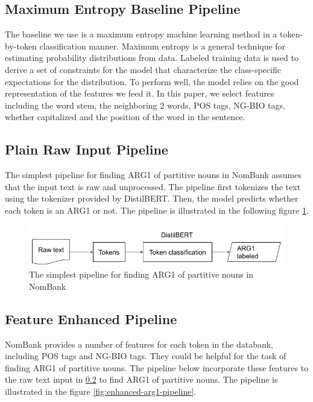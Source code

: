 \documentclass[11pt]{article}
\begin{document}
\subsection{Maximum Entropy Baseline Pipeline}

The baseline we use is a maximum entropy machine learning method in a token-by-token classification manner. Maximum entropy is a general technique for estimating probability distributions from data. Labeled training data
is used to derive a set of constraints for the model that
characterize the class-specific expectations for the distribution. To perform well, the model relies on the good representation of the features we feed it. In this paper, we select features including the word stem, the neighboring 2 words, POS tags, NG-BIO tags, whether capitalized and the position of the word in the sentence.

\subsection{Plain Raw Input Pipeline}
\label{section:plain-pipeline}

The simplest pipeline for finding ARG1 of partitive nouns in NomBank assumes that the input text is raw and unprocessed. The pipeline first tokenizes the text using the tokenizer provided by DistilBERT. Then, the model predicts whether each token is an ARG1 or not. The pipeline is illustrated in the following figure \ref{fig:simplest-arg1-pipeline}.

\begin{figure}[h]
  \centering
  \includegraphics[width=\linewidth]{assets/simplest-arg1-pipeline.png}
  \caption{The simplest pipeline for finding ARG1 of partitive nouns in NomBank}
  \label{fig:simplest-arg1-pipeline}
\end{figure}

\subsection{Feature Enhanced Pipeline}

NomBank provides a number of features for each token in the databank, including POS tags and NG-BIO tags. They could be helpful for the task of finding ARG1 of partitive nouns. The pipeline below incorporate these features to the raw text input in \ref{section:plain-pipeline} to find ARG1 of partitive nouns. The pipeline is illustrated in the figure \ref{fig:enhanced-arg1-pipeline}.
\end{document}
